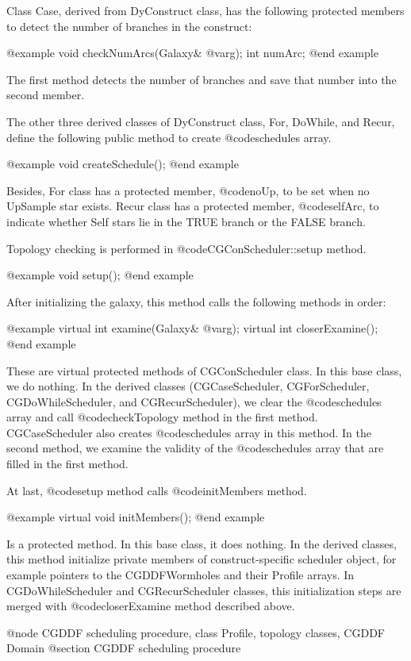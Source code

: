 {Class Case, derived from DyConstruct class, has the following protected
members to detect the number of branches in the construct:

@example
void checkNumArcs(Galaxy& @var{g});
int numArc;
@end example

The first method detects the number of branches and save that number into
the second member.

The other three derived classes of DyConstruct class, For, DoWhile, and Recur,
define the following public method to create @code{schedules} array.

@example
void createSchedule();
@end example

Besides, For class has a protected member, @code{noUp}, to be set when
no UpSample star exists. Recur class has a protected member, @code{selfArc},
to indicate whether Self stars lie in the TRUE branch or the FALSE branch.

Topology checking is performed in @code{CGConScheduler::setup} method.

@example
void setup();
@end example

After initializing the galaxy, this method calls the following methods
in order:

@example
virtual int examine(Galaxy& @var{g});
virtual int closerExamine();
@end example

These are virtual protected methods of CGConScheduler class.
In this base class, we do nothing. In the derived classes (CGCaseScheduler,
CGForScheduler, CGDoWhileScheduler, and CGRecurScheduler), we clear the
@code{schedules} array and call @code{checkTopology} method in the first
method. CGCaseScheduler also creates @code{schedules} array in this method.
In the second method, we examine the validity of the
@code{schedules} array that are filled in the first method.

At last, @code{setup} method calls @code{initMembers} method.

@example
virtual void initMembers();
@end example

Is a protected method. In this base class, it does nothing. In the
derived classes, this method initialize private members of construct-specific
scheduler object, for example pointers to the CGDDFWormholes and their
Profile arrays. In CGDoWhileScheduler and CGRecurScheduler classes,
this initialization steps are merged with @code{closerExamine} method
described above.

@node CGDDF scheduling procedure, class Profile, topology classes, CGDDF Domain
@section CGDDF scheduling procedure

}
